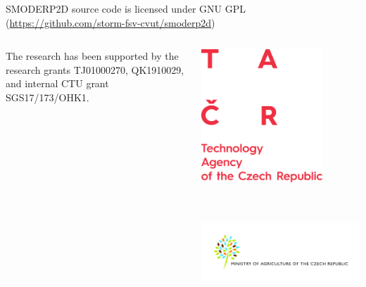 \justifying
{\rmfamily
\vspace{0.4cm}
SMODERP2D source code is licensed under GNU
GPL (\url{https://github.com/storm-fsv-cvut/smoderp2d})
}

\begin{columns}
    \begin{column}{0.4\textwidth}
        \justifying
        {\rmfamily
        The research has been supported by the research grants
        TJ01000270,
        QK1910029,
        and internal CTU grant SGS17/173/OHK1.
        }
    \end{column}
    \begin{column}{0.6\textwidth}
        \centering
        \includegraphics[height = 5cm]{obr/logo_TACR_dopln_AJ.png}
        \includegraphics[height = 5cm]{obr/LogoMZeAJ.jpg}
    \end{column}
\end{columns}




